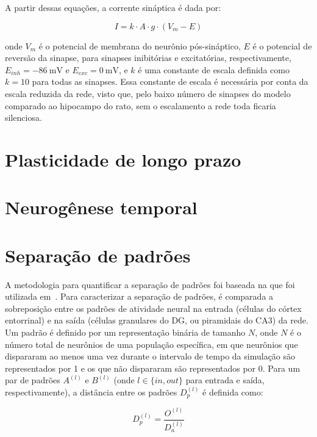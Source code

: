A partir dessas equações, a corrente sináptica é dada por:

\begin{equation}
    \label{eq_tsodyks_I}
    I = k \cdot A \cdot g \cdot (V_m - E)
\end{equation}

onde $V_m$ é o potencial de membrana do neurônio pós-sináptico, $E$ é o potencial de reversão da sinapse, para sinapses
inibitórias e excitatórias, respectivamente, $E_{inh} = \SI{-86}{\milli\volt}$ e $E_{exc} = \SI{0}{\milli\volt}$, e $k$
é uma constante de escala definida como $k = 10$ para todas as sinapses. Essa constante de escala é necessária por conta
da escala reduzida da rede, visto que, pelo baixo número de sinapses do modelo comparado ao hipocampo do rato, sem o 
escalamento a rede toda ficaria silenciosa.





\section{Plasticidade de longo prazo}

\section{Neurogênese temporal}

\section{Separação de padrões}

A metodologia para quantificar a separação de padrões foi baseada na que foi utilizada em~\cite{kimEffect2024}.
Para caracterizar a separação de padrões, é comparada a sobreposição entre os padrões de atividade neural na entrada (células do
córtex entorrinal) e na saída (células granulares do DG, ou piramidais do CA3) da rede. Um padrão é definido por um
representação binária de tamanho $N$, onde $N$ é o número total de neurônios de uma população específica, em que neurônios que
dispararam ao menos uma vez durante o intervalo de tempo da simulação são representados por 1 e os que não dispararam são
representados por 0. Para um par de padrões $A^{(l)}$ e $B^{(l)}$ (onde $l \in \{in, out\}$ para entrada e saída,
respectivamente), a distância entre os padrões $D_p^{(l)}$ é definida como:

\begin{equation}
    \label{eq:dp}
    D_p^{(l)} = \frac{O^{(l)}}{D_a^{(l)}}
\end{equation}

